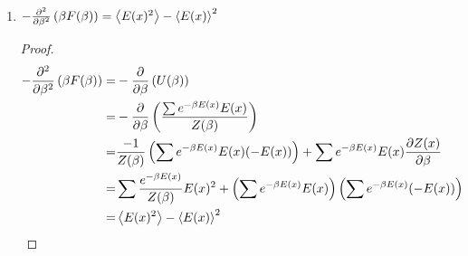 \documentclass[letterpaper,english,10pt]{article}
\begin{document}
\begin{lem}
\begin{enumerate}
\begin{proof}
\begin{align*}
\end{align*}
Now note that $\mu_{\beta}(x)=\frac{e^{-\beta E(x)}}{Z(\beta)}$. Taking ln on both sides, we have $\ln \mu_\beta(x)=\beta E(x)-\ln Z(\beta)$. Substituting for $\beta E(x)$, we have:
\begin{align*}
S(\beta)=& \ln Z(\beta)+\sum \mu_{\beta} \left(-\ln \mu_\beta(x)-\ln Z(\beta) \right)  \\
=&-\sum \mu_\beta \ln \mu_\beta(x)  \hspace{15mm} (\sum \mu_{\beta}(x)=1)\\
=&H(\mu_\beta)/\ln 2
\end{align*}
\end{proof}
\textbf{Thus, the canonical entropy is the Shannon entropy of the Boltzmann distribution (up to a multiplicative constant).} 
\item $-\frac{\partial ^2}{\partial \beta^2} \left( \beta F(\beta) \right)=\left\langle E(x)^2 \right\rangle-\left\langle E(x) \right\rangle^2$
\begin{proof}
\begin{align*}
-\frac{\partial ^2}{\partial \beta^2} \left( \beta F(\beta) \right)=&-\frac{\partial}{\partial \beta} \left( U(\beta)\right) \\
=&-\frac{\partial}{\partial \beta} \left( \frac{\sum e^{-\beta E(x)} E(x)} {Z(\beta)}\right) \\
=&\frac{-1}{Z(\beta)} \left(\sum e^{-\beta E(x)} E(x) (-E(x)) \right)+\sum e^{-\beta E(x)} E(x) \frac{\partial Z(x)}{\partial \beta} \\
=& \sum \frac{e^{-\beta E(x)}}{Z(\beta)} E(x)^2+\left(\sum e^{-\beta E(x)} E(x)\right) \left( \sum e^{-\beta E(x)} (-E(x))\right) \\
=&\left\langle E(x)^2 \right\rangle-\left\langle E(x) \right\rangle^2
\end{align*}
\end{proof}
\end{enumerate}
\end{lem}
\end{document}
